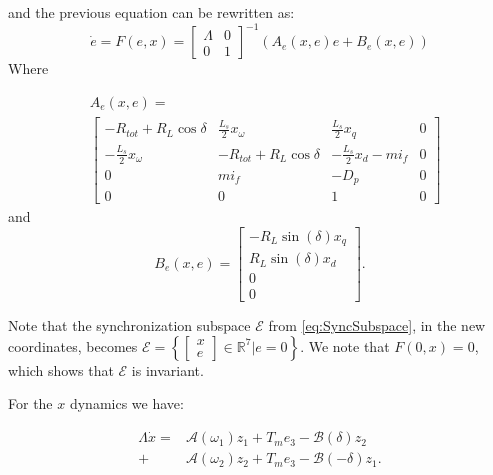 \documentclass[letterpaper, 10 pt, conference]{ieeeconf}
\begin{document}
and the previous equation can be rewritten as:
$$
\dot{e}  = F(e,x) =\left[\begin{array}{cc}
\varLambda & 0\\
0 & 1
\end{array}\right]^{-1}\left(A_e\left(x,e\right) e +B_e\left(x,e\right)  \right)
$$
Where 

$$
\begin{aligned}
&A_e\left(x,e\right)  = \\ & \left[\begin{array}{cccc}
-R_{tot}+R_{L}\cos\delta & \frac{L_{s}}{2}x_{\omega} & \frac{L_{s}}{2}x_{q} & 0\\
-\frac{L_{s}}{2}x_{\omega} & -R_{tot}+R_{L}\cos\delta & -\frac{L_{s}}{2}x_{d}-mi_f & 0\\
0 & mi_{f} & -D_{p} & 0\\
0 & 0 & 1 & 0
\end{array}\right]
\end{aligned}
$$ 
and
$$
B_e\left(x,e\right) = 
\left[\begin{array}{c}
-R_{L}\sin(\delta)x_{q}\\
R_{L}\sin(\delta)x_{d}\\
0\\
0
\end{array}\right].
$$

Note that the synchronization subspace $\mathscr{E}$ from \eqref{eq:SyncSubspace}, in the new coordinates, becomes $\mathscr{E}=\left\{\left[ \begin{array}{c}
x \\
e
\end{array}\right] \in\mathbb{R}^{7}|e=0 \right\}$.
We note that $F(0,x)=0$, which shows that 
$\mathscr{E} $ is invariant.

For the $x$ dynamics we have:

$$
\begin{aligned}
\Lambda\dot{x}= & \mathcal{A}(\omega_{1})z_{1}+T_{m}e_{3}-\mathcal{B}(\delta)z_{2}\\+&\mathcal{A}(\omega_{2})z_{2}  +T_{m}e_{3}-\mathcal{B}(-\delta)z_{1}.
\end{aligned}
$$
\end{document}
